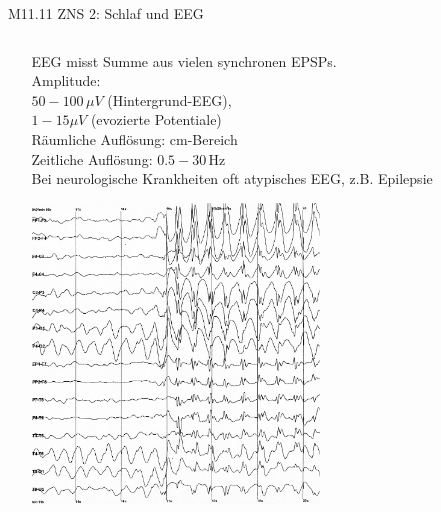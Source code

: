 \documentclass{beamer}
\begin{document}
\begin{frame}{M11.11 ZNS 2: Schlaf und EEG}
\begin{columns}[c]
\begin{column}{5cm}
\end{column}

\begin{column}{6cm}

EEG misst Summe aus vielen synchronen EPSPs.   \\
Amplitude: \\ \(50-100\,\mu V\) (Hintergrund-EEG), \\ \(1-15\mu V\) (evozierte Potentiale) \\
Räumliche Auflösung: cm-Bereich \\
Zeitliche Auflösung: \(0.5-30\,\)Hz \\ \pause
Bei neurologische Krankheiten oft atypisches EEG, z.B. Epilepsie 


\begin{center}
    \includegraphics[width=0.6\textwidth]{Spike-waves.png}
\end{center}


\end{column}


\end{columns}

\end{frame}
\end{document}
